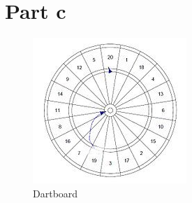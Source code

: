 \section{Part c}

\begin{figure}[H]
	\centering
	\includegraphics[scale=0.9]{Dartboard_optimal.jpg}
	\caption{Dartboard}
\end{figure}

